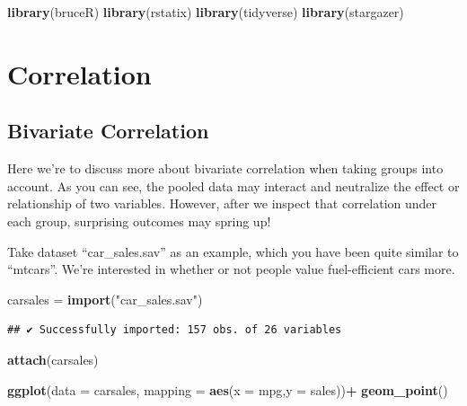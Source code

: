 \documentclass[
]{ctexart}
\newenvironment{Shaded}{\begin{snugshade}}{\end{snugshade}}
\newcommand{\AttributeTok}[1]{\textcolor[rgb]{0.13,0.29,0.53}{#1}}
\newcommand{\FunctionTok}[1]{\textcolor[rgb]{0.13,0.29,0.53}{\textbf{#1}}}
\newcommand{\NormalTok}[1]{#1}
\newcommand{\OtherTok}[1]{\textcolor[rgb]{0.56,0.35,0.01}{#1}}
\newcommand{\SpecialCharTok}[1]{\textcolor[rgb]{0.81,0.36,0.00}{\textbf{#1}}}
\newcommand{\StringTok}[1]{\textcolor[rgb]{0.31,0.60,0.02}{#1}}
\begin{document}
\begin{Shaded}
\begin{Highlighting}[]
\FunctionTok{library}\NormalTok{(bruceR)}
\FunctionTok{library}\NormalTok{(rstatix)}
\FunctionTok{library}\NormalTok{(tidyverse)}
\FunctionTok{library}\NormalTok{(stargazer)}
\end{Highlighting}
\end{Shaded}

\hypertarget{correlation}{%
\section{Correlation}\label{correlation}}

\hypertarget{bivariate-correlation}{%
\subsection{Bivariate Correlation}\label{bivariate-correlation}}

Here we're to discuss more about bivariate correlation when taking
groups into account. As you can see, the pooled data may interact and
neutralize the effect or relationship of two variables. However, after
we inspect that correlation under each group, surprising outcomes may
spring up!

Take dataset ``car\_sales.sav'' as an example, which you have been quite
similar to ``mtcars''. We're interested in whether or not people value
fuel-efficient cars more.

\begin{Shaded}
\begin{Highlighting}[]
\NormalTok{carsales }\OtherTok{=} \FunctionTok{import}\NormalTok{(}\StringTok{"car\_sales.sav"}\NormalTok{)}
\end{Highlighting}
\end{Shaded}

\begin{verbatim}
## ✔ Successfully imported: 157 obs. of 26 variables
\end{verbatim}

\begin{Shaded}
\begin{Highlighting}[]
\FunctionTok{attach}\NormalTok{(carsales)}
\end{Highlighting}
\end{Shaded}

\begin{Shaded}
\begin{Highlighting}[]
\FunctionTok{ggplot}\NormalTok{(}\AttributeTok{data =}\NormalTok{ carsales, }\AttributeTok{mapping =} \FunctionTok{aes}\NormalTok{(}\AttributeTok{x =}\NormalTok{ mpg,}\AttributeTok{y =}\NormalTok{ sales))}\SpecialCharTok{+}
  \FunctionTok{geom\_point}\NormalTok{()}
\end{Highlighting}
\end{Shaded}
\end{document}
